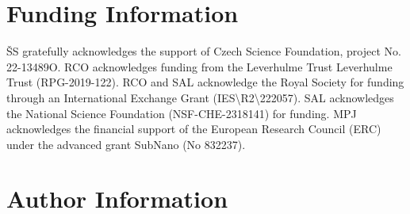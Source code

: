 \documentclass[9pt,bestpractices]{livecoms}
\begin{document}
\section*{Funding Information}
ŠS gratefully acknowledges the support of Czech Science Foundation, project No. 22-13489O. RCO acknowledges funding from the Leverhulme Trust Leverhulme Trust (RPG-2019-122). RCO and SAL acknowledge the Royal Society for funding through an International Exchange Grant (IES\textbackslash R2\textbackslash 222057). SAL acknowledges the National Science Foundation (NSF-CHE-2318141) for funding. MPJ acknowledges the financial support of the European Research Council (ERC) under the advanced grant SubNano (No 832237).

\section*{Author Information}
\makeorcid




\end{document}
